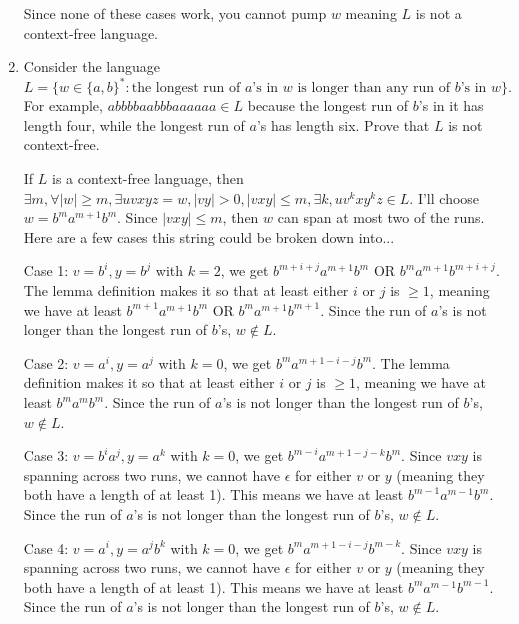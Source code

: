\documentclass[12pt]{article}
\begin{document}
\begin{enumerate}
Since none of these cases work, you cannot pump $w$ meaning $L$ is not a context-free language. \color{black}



\item Consider the language 
\begin{displaymath}
    L = \{w \in \{a,b\}^* : \text{the longest run of } a\text{'s in } w \text{ is longer than any run of } b\text{'s in } w\}.
\end{displaymath}
For example, $abbbbaabbbaaaaaa \in L$ because the longest run of $b$'s in it has length four, while the longest run of $a$'s has length six. Prove that $L$ is not context-free.

\color{blue} If $L$ is a context-free language, then $\exists m, \forall |w| \geq m, \exists uvxyz = w, |vy| > 0, |vxy| \leq m, \exists k, uv^kxy^kz \in L$. I'll choose $w = b^ma^{m+1}b^m$. Since $|vxy| \leq m$, then $w$ can span at most two of the runs. Here are a few cases this string could be broken down into...

Case 1: $v = b^i, y = b^j$ with $k = 2$, we get $b^{m+i+j}a^{m+1}b^m$ OR $b^ma^{m+1}b^{m+i+j}$. The lemma definition makes it so that at least either $i$ or $j$ is $\geq 1$, meaning we have at least $b^{m+1}a^{m+1}b^m$ OR $b^ma^{m+1}b^{m+1}$. Since the run of $a$'s is not longer than the longest run of $b$'s, $w \notin L$.

Case 2: $v = a^i, y = a^j$ with $k = 0$, we get $b^ma^{m+1-i-j}b^m$. The lemma definition makes it so that at least either $i$ or $j$ is $\geq 1$, meaning we have at least $b^ma^mb^m$. Since the run of $a$'s is not longer than the longest run of $b$'s, $w \notin L$.

Case 3: $v = b^ia^j, y = a^k$ with $k = 0$, we get $b^{m-i}a^{m+1-j-k}b^m$. Since $vxy$ is spanning across two runs, we cannot have $\epsilon$ for either $v$ or $y$ (meaning they both have a length of at least 1). This means we have at least $b^{m-1}a^{m-1}b^m$. Since the run of $a$'s is not longer than the longest run of $b$'s, $w \notin L$.

Case 4: $v = a^i, y = a^jb^k$ with $k = 0$, we get $b^ma^{m+1-i-j}b^{m-k}$. Since $vxy$ is spanning across two runs, we cannot have $\epsilon$ for either $v$ or $y$ (meaning they both have a length of at least 1). This means we have at least $b^ma^{m-1}b^{m-1}$. Since the run of $a$'s is not longer than the longest run of $b$'s, $w \notin L$.


\end{enumerate}
\end{document}
